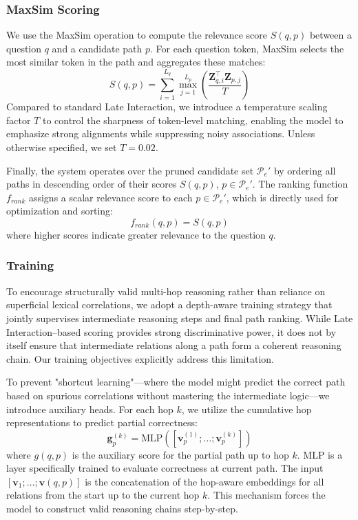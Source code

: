 \documentclass[conference]{IEEEtran}
\begin{document}
\subsubsection{MaxSim Scoring}
We use the MaxSim operation \cite{khattab2020colbert} to compute the relevance score $S(q,p)$ between a question $q$ and a candidate path $p$. For each question token, MaxSim selects the most similar token in the path and aggregates these matches:
\begin{equation}
    S(q, p) = \sum_{i=1}^{L_q} \max_{j=1}^{L_p} \left( \frac{\mathbf{Z}_{q,i}^\top \mathbf{Z}_{p,j}}{T} \right)
    \label{eq:maxsim}
\end{equation}
Compared to standard Late Interaction, we introduce a temperature scaling factor $T$ to control the sharpness of token-level matching, enabling the model to emphasize strong alignments while suppressing noisy associations. Unless otherwise specified, we set $T=0.02$. 

Finally, the system operates over the pruned candidate set $\mathcal{P}_{e}'$ by ordering all paths in descending order of their scores $S(q,p)$, $p \in \mathcal{P}_{e}'$. The ranking function $f_{rank}$ assigns a scalar relevance score to each $p \in \mathcal{P}_{e}'$, which is directly used for optimization and sorting:
    \begin{equation}
    f_{rank}(q, p) = S(q, p)
    \end{equation}
where higher scores indicate greater relevance to the question $q$. 

\subsubsection{Training}
To encourage structurally valid multi-hop reasoning rather than reliance on superficial lexical correlations, we adopt a depth-aware training strategy that jointly supervises intermediate reasoning steps and final path ranking. While Late Interaction–based scoring provides strong discriminative power, it does not by itself ensure that intermediate relations along a path form a coherent reasoning chain. Our training objectives explicitly address this limitation.

To prevent "shortcut learning"---where the model might predict the correct path based on spurious correlations without mastering the intermediate logic---we introduce auxiliary heads. For each hop $k$, we utilize the cumulative hop representations to predict partial correctness:
\begin{equation}
    \mathbf{g}_p^{(k)} = \text{MLP}([\mathbf{v}_p^{(1)}; \dots; \mathbf{v}_p^{(k)}])
\end{equation}
where $g(q,p)$ is the auxiliary score for the partial path up to hop $k$. $\text{MLP}$ is a layer specifically trained to evaluate correctness at current path. The input $[\mathbf{v}_1; \dots; \mathbf{v}(q,p)]$ is the concatenation of the hop-aware embeddings for all relations from the start up to the current hop $k$. This mechanism forces the model to construct valid reasoning chains step-by-step.
\end{document}
